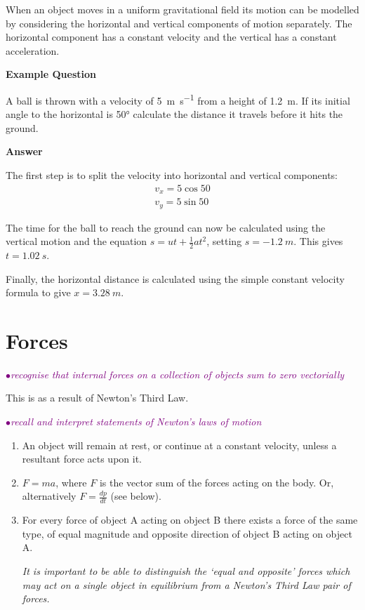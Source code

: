 \documentclass[a4paper,11pt,twoside]{memoir}
\newcounter{spec}[chapter]
\newcommand{\spec}[1]{\Needspace{5\baselineskip}\textcolor{purple}{$\bullet$\hspace{0.5cm}\textit{#1}}}
\newcommand{\answer}{\par \textbf{Answer} \par}
\newenvironment{example}
{\begin{lrbox}{\examplebox}\begin{minipage}{0.9\textwidth}\textbf{Example Question}\par}
{\end{minipage}\end{lrbox}\fbox{\usebox{\examplebox}}}
\begin{document}
When an object moves in a uniform gravitational field its motion can be modelled by considering the horizontal and vertical components of motion separately. The horizontal component has a constant velocity and the vertical has a constant acceleration.

\begin{example}
A ball is thrown with a velocity of \SI{5}{m.s^{-1}} from a height of \SI{1.2}{m}. If its initial angle to the horizontal is \ang{50} calculate the distance it travels before it hits the ground.
\answer

The first step is to split the velocity into horizontal and vertical components:
	\begin{align*}
		v_x = 5\cos{50}\\
		v_y = 5\sin{50}
	\end{align*}

	The time for the ball to reach the ground can now be calculated using the vertical motion and the equation $s=ut+\frac{1}{2}at^2$, setting $s = \SI{-1.2}{m}$. This gives $t=\SI{1.02}{s}$.

	Finally, the horizontal distance is calculated using the simple constant velocity formula to give $x=\SI{3.28}{m}$.
\end{example}

\section{Forces}

\spec{recognise that internal forces on a collection of objects sum to zero vectorially}

This is as a result of Newton's Third Law.

\spec{recall and interpret statements of Newton’s laws of motion}
\begin{enumerate}
	\item An object will remain at rest, or continue at a constant velocity, unless a resultant force acts upon it.
	\item $F=ma$, where $F$ is the vector sum of the forces acting on the body. Or, alternatively $F=\frac{dp}{dt}$ (see below).
	\item For every force of object A acting on object B there exists a force of the same type, of equal magnitude and opposite direction of object B acting on object A.

	\emph{It is important to be able to distinguish the `equal and opposite' forces which may act on a single object in equilibrium from a Newton's Third Law pair of forces.}
\end{enumerate}
\end{document}
